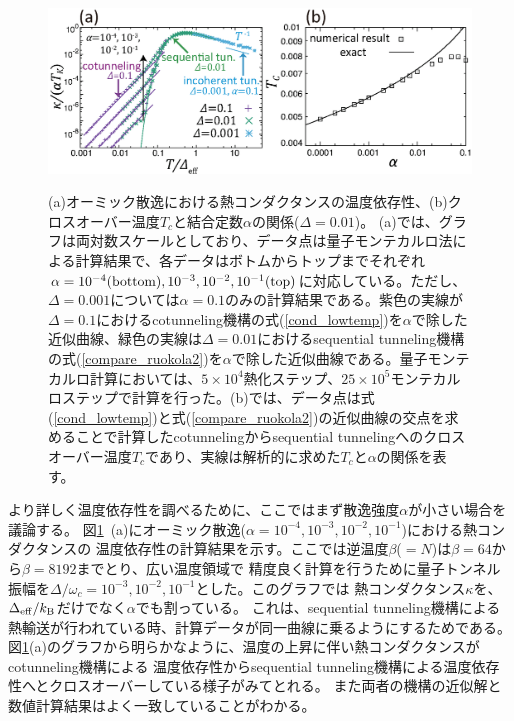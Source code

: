\begin{figure}[tb]
　\centering
　\includegraphics[width=165mm]{conductance_s1.eps}
　\caption{
	(a)オーミック散逸における熱コンダクタンスの温度依存性、(b)クロスオーバー温度$T_c$と結合定数$\alpha$の関係($\Delta=0.01$)。
		(a)では、グラフは両対数スケールとしており、データ点は量子モンテカルロ法による計算結果で、各データはボトムからトップまでそれぞれ$\alpha=10^{-4}(\rm{bottom}), 10^{-3},10^{-2},10^{-1}(\rm{top})$に対応している。ただし、$\Delta=0.001$については$\alpha=0.1$のみの計算結果である。紫色の実線が$\Delta=0.1$におけるcotunneling機構の式(\ref{cond_lowtemp})を$\alpha$で除した近似曲線、緑色の実線は$\Delta=0.01$におけるsequential tunneling機構の式(\ref{compare_ruokola2})を$\alpha$で除した近似曲線である。量子モンテカルロ計算においては、$5\times10^4$熱化ステップ、$25\times10^5$モンテカルロステップで計算を行った。(b)では、データ点は式(\ref{cond_lowtemp})と式(\ref{compare_ruokola2})の近似曲線の交点を求めることで計算したcotunnelingからsequential tunnelingへのクロスオーバー温度$T_c$であり、実線は解析的に求めた$T_c$と$\alpha$の関係を表す。
	}
	\label{fig:conductance_s1}
\end{figure}

より詳しく温度依存性を調べるために、ここではまず散逸強度$\alpha$が小さい場合を議論する。
図\ref{fig:conductance_s1}~(a)にオーミック散逸($\alpha = 10^{-4}, 10^{-3}, 10^{-2}, 10^{-1}$)における熱コンダクタンスの
温度依存性の計算結果を示す。ここでは逆温度$\beta$($=N$)は$\beta=64$から$\beta=8192$までとり、広い温度領域で
精度良く計算を行うために量子トンネル振幅を$\Delta/\omega_c=10^{-3},10^{-2},10^{-1}$とした。このグラフでは
熱コンダクタンス$\kappa$を、$\Delta_{\rm eff}/k_{\rm B}$だけでなく$\alpha$でも割っている。
これは、sequential tunneling機構による熱輸送が行われている時、計算データが同一曲線に乗るようにするためである。
図\ref{fig:conductance_s1}(a)のグラフから明らかなように、温度の上昇に伴い熱コンダクタンスがcotunneling機構による
温度依存性からsequential tunneling機構による温度依存性へとクロスオーバーしている様子がみてとれる。
また両者の機構の近似解と数値計算結果はよく一致していることがわかる。

